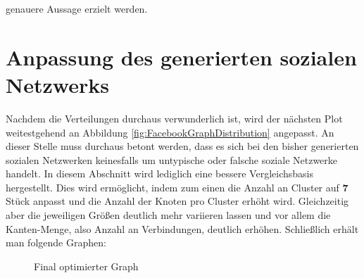 genauere Aussage erzielt werden. 


\section{Anpassung des generierten sozialen Netzwerks}
Nachdem die Verteilungen durchaus verwunderlich ist, wird der nächsten Plot weitestgehend an Abbildung \ref{fig:FacebookGraphDistribution} angepasst. An dieser Stelle muss durchaus betont werden, dass es sich bei den bisher generierten sozialen Netzwerken keinesfalls um untypische oder falsche soziale Netzwerke handelt. In diesem Abschnitt wird lediglich eine bessere Vergleichsbasis hergestellt. Dies wird ermöglicht, indem zum einen die Anzahl an Cluster auf \textbf{7} Stück anpasst und die Anzahl der Knoten pro Cluster erhöht wird. Gleichzeitig aber die jeweiligen Größen deutlich mehr variieren lassen und vor allem die Kanten-Menge, also Anzahl an Verbindungen, deutlich erhöhen. Schließlich erhält man folgende Graphen: 

\FloatBarrier
\begin{figure}[h!]%
  \centering
  \qquad
  \caption{Final optimierter Graph}
  \label{fig:ourGraphFinalPlot}
\end{figure}
\FloatBarrier

